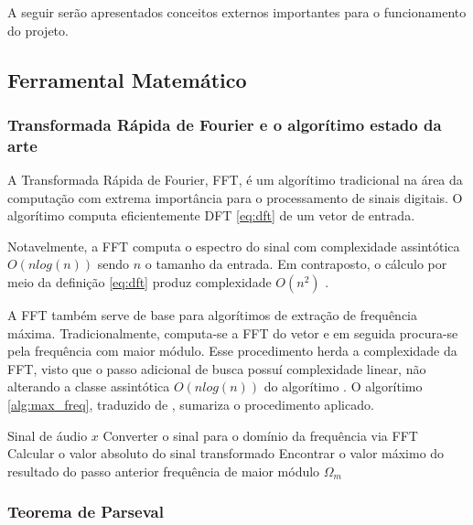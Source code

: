 
A seguir serão apresentados conceitos externos importantes para
o funcionamento do projeto.

\subsection{Ferramental Matemático}

\subsubsection{Transformada Rápida de Fourier e o algorítimo estado da arte}

A Transformada Rápida de Fourier, \ac{FFT}, é um algorítimo tradicional na área da computação com extrema importância para o processamento de sinais digitais. O algorítimo computa eficientemente \ac{DFT} \eqref{eq:dft} de um vetor de entrada.

Notavelmente, a \ac{FFT} computa o espectro do sinal com complexidade assintótica $O(nlog(n))$ sendo $n$ o tamanho da entrada. Em contraposto, o cálculo por meio da definição \eqref{eq:dft} produz complexidade $O(n^2)$ \cite{cooley1965}.

\label{sub:stateoftheart}
A \ac{FFT} também serve de base para algorítimos de extração de frequência máxima. Tradicionalmente, computa-se a \ac{FFT} do vetor e em seguida procura-se pela frequência com maior módulo. Esse procedimento herda a complexidade da \ac{FFT}, visto que o passo adicional de busca possuí complexidade linear, não alterando a classe assintótica $O(nlog(n))$ do algorítimo \cite{Rastislav2013,Garima2020}. O algorítimo \ref{alg:max_freq}, traduzido de , sumariza o procedimento aplicado.

\begin{algorithm}
\caption{Frequência Máxima}
\label{alg:max_freq}
\begin{algorithmic}[1]
    \Require Sinal de áudio $x$
    \State Converter o sinal para o domínio da frequência via FFT
    \State Calcular o valor absoluto do sinal transformado
    \State Encontrar o valor máximo do resultado do passo anterior
    \State \Return frequência de maior módulo $\Omega_m$
\end{algorithmic}
\end{algorithm}

\subsubsection{Teorema de Parseval}

